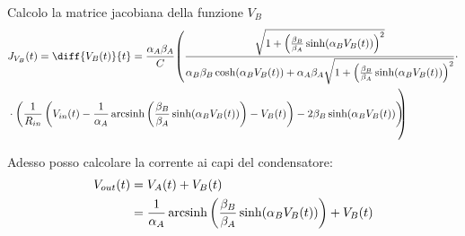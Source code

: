 	Calcolo la matrice jacobiana della funzione $V_{B}$
	\begin{equation}
		\label{eq:jacobiana}
		\begin{split}
			&J_{V_{B}}(t) = \diff{V_{B}(t)}{t} = \frac{\alpha_{A}\beta_{A}}{C}\reallybig(\frac{\sqrt{1+\left(\frac{\beta_{B}}{\beta_{A}}\sinh(\alpha_{B}V_{B}(t))\right)^{2}}}{\alpha_{B}\beta_{B}\cosh(\alpha_{B}V_{B}(t))+\alpha_{A}\beta_{A}\sqrt{1+\left(\frac{\beta_{B}}{\beta_{A}}\sinh(\alpha_{B}V_{B}(t))\right)^{2}}}\cdot\\&\cdot\left(\frac{1}{R_{in}}\left(V_{in}(t)-\frac{1}{\alpha_{A}} \arcsinh \left(\frac{\beta_{B}}{\beta_{A}} \sinh(\alpha_{B}V_{B}(t))\right)-V_{B}(t)\right)-2\beta_{B}\sinh(\alpha_{B}V_{B}(t))\right)\hspace{-7px}\reallybig)
		\end{split}
	\end{equation}
	
	Adesso posso calcolare la corrente ai capi del condensatore:
	\begin{equation}
		\label{eq:punto_fisso2}
		\begin{split}
			V_{out}(t) &= V_{A}(t)+V_{B}(t)\\
			&= \frac{1}{\alpha_{A}} \operatorname{arcsinh} \left(\frac{\beta_{B}}{\beta_{A}} \sinh(\alpha_{B}V_{B}(t))\right)+V_{B}(t)
		\end{split}
	\end{equation}